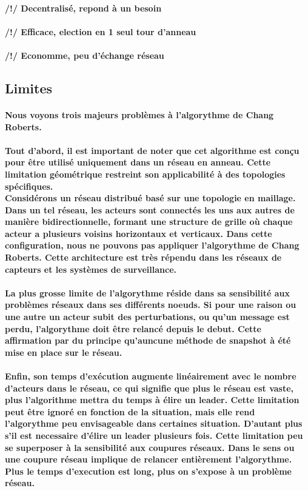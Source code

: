 \documentclass[12pt]{article}
\begin{document}
\paragraph{/!/ Decentralisé, repond à un besoin}
\paragraph{/!/ Efficace, election en 1 seul tour d'anneau }
\paragraph{/!/ Economme, peu d'échange réseau}
\subsection{Limites}
\paragraph{Nous voyons trois majeurs problèmes à l'algorythme de Chang Roberts.}
\paragraph{Tout d'abord, il est important de noter que cet algorithme est conçu pour être utilisé uniquement dans un réseau en anneau. Cette limitation géométrique restreint son applicabilité à des topologies spécifiques.\\
Considérons un réseau distribué basé sur une topologie en maillage. Dans un tel réseau, les acteurs sont connectés les uns aux autres de manière bidirectionnelle, formant une structure de grille où chaque acteur a plusieurs voisins horizontaux et verticaux. Dans cette configuration, nous ne pouvons pas appliquer l'algorythme de Chang Roberts. Cette architecture est très répendu dans les réseaux de capteurs et les systèmes de surveillance.}
\paragraph{La plus grosse limite de l'algorythme réside dans sa sensibilité aux problèmes réseaux dans ses différents noeuds. Si pour une raison ou une autre un acteur subit des perturbations, ou qu'un message est perdu, l'algorythme doit être relancé depuis le debut. Cette affirmation par du principe qu'auncune méthode de snapshot à été mise en place sur le réseau.}
\paragraph{Enfin, son temps d'exécution augmente linéairement avec le nombre d'acteurs dans le réseau, ce qui signifie que plus le réseau est vaste, plus l'algorithme mettra du temps à élire un leader. Cette limitation peut être ignoré en fonction de la situation, mais elle rend l'algorythme peu envisageable dans certaines situation. D'autant plus s'il est necessaire d'élire un leader plusieurs fois. Cette limitation peu se superposer à la sensibilité aux coupures réseaux. Dans le sens ou une coupure réseau implique de relancer entièrement l'algorythme. Plus le temps d'execution est long, plus on s'expose à un problème réseau.}
\end{document}
